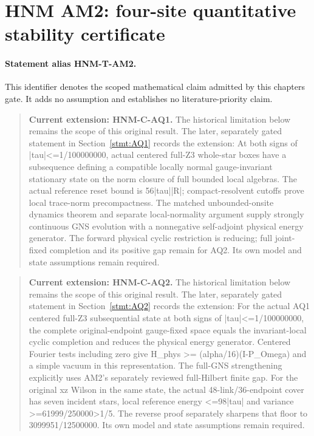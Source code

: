 \hypertarget{r29-am2-am2-forward-hnm-four-site-quantitative-stability-certificate}{%
\section{HNM AM2: four-site quantitative stability certificate\workstar}\label{r29:am2:r29-am2-am2-forward-hnm-four-site-quantitative-stability-certificate}}
\paragraph{Statement alias HNM-T-AM2.}\label{stmt:AM2} This identifier denotes the scoped mathematical claim admitted by this chapter\textquotesingle s gate. It adds no assumption and establishes no literature-priority claim.
\begin{quote}\small\textbf{Current extension: HNM-C-AQ1.} The historical limitation below remains the scope of this original result. The later, separately gated statement in Section~\ref{stmt:AQ1} records the extension: At both signs of |tau|<=1/100000000, actual centered full-Z3 whole-star boxes have a subsequence defining a compatible locally normal gauge-invariant stationary state on the norm closure of full bounded local algebras. The actual reference reset bound is 56|tau||R|; compact-resolvent cutoffs prove local trace-norm precompactness. The matched unbounded-onsite dynamics theorem and separate local-normality argument supply strongly continuous GNS evolution with a nonnegative self-adjoint physical energy generator. The forward physical cyclic restriction is reducing; full joint-fixed completion and its positive gap remain for AQ2. Its own model and state assumptions remain required.\end{quote}
\begin{quote}\small\textbf{Current extension: HNM-C-AQ2.} The historical limitation below remains the scope of this original result. The later, separately gated statement in Section~\ref{stmt:AQ2} records the extension: For the actual AQ1 centered full-Z3 subsequential state at both signs of |tau|<=1/100000000, the complete original-endpoint gauge-fixed space equals the invariant-local cyclic completion and reduces the physical energy generator. Centered Fourier tests including zero give H\_phys >= (alpha/16)(I-P\_Omega) and a simple vacuum in this representation. The full-GNS strengthening explicitly uses AM2's separately reviewed full-Hilbert finite gap. For the original xz Wilson in the same state, the actual 48-link/36-endpoint cover has seven incident stars, local reference energy <=98|tau| and variance >=61999/250000>1/5. The reverse proof separately sharpens that floor to 3099951/12500000. Its own model and state assumptions remain required.\end{quote}

